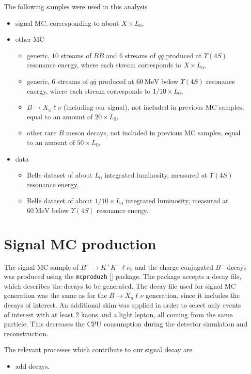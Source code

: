 \documentclass[  headings=standardclasses,
  headings=big,oneside,a4paper,openany,12pt]{scrbook}
\newcommand {\e}[1]{\mathrm{~#1}}
\begin{document}
The following samples were used in this analysis
\begin{itemize}
\item signal MC, corresponding to about $X \times L_0$,
\item other MC
\begin{itemize}
\item generic, $10$ streams of $B\bar B$ and $6$ streams of $q\bar q$ produced at $\Upsilon(4S)$ resonance energy, where each stream corresponds to $X \times L_0$,
\item generic, $6$ streams of $q\bar q$ produced at $60\e{MeV}$ below $\Upsilon(4S)$ resonance energy, where each stream corresponds to $1/10 \times L_0$,
\item $B\to X_u \ell \nu$ (including our signal), not included in previous MC samples, equal to an amount of $20 \times L_0$, 
\item other rare $B$ meson decays, not included in previous MC samples, equal to an amount of $50 \times L_0$, 
\end{itemize}
\item data
\begin{itemize}
\item Belle dataset of about $L_0$ integrated luminosity, measured at $\Upsilon(4S)$ resonance energy,
\item Belle dataset of about $1/10 \times L_0$ integrated luminosity, measured at $60\e{MeV}$ below $\Upsilon(4S)$ resonance energy.
\end{itemize}
\end{itemize}

\section{Signal MC production}

The signal MC sample of $B^+ \to K^+ K^- \ell \nu_\ell$ and the charge conjugated $B^-$ decays was produced using the \texttt{mcproduzh} [] package. The package accepts a decay file, which describes the decays to be generated. The decay file used for signal MC generation was the same as for the $B\to X_u \ell \nu$ generation, since it includes the decays of interest. An additional skim was applied in order to select only events of interest with at least 2 kaons and a light lepton, all coming from the same particle. This decreases the CPU consumption during the detector simulation and reconstruction.

The relevant processes which contribute to our signal decay are
\begin{itemize}
\item add decays.
\end{itemize}
\end{document}
